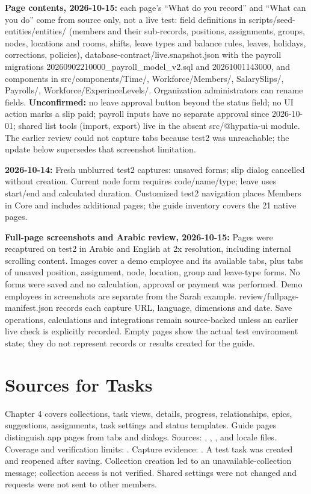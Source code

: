 \textbf{Page contents, 2026-10-15:} each page's “What do you record” and “What can you do” come from source only, not a live test: field definitions in scripts/seed-entities/entities/ (members and their sub-records, positions, assignments, groups, nodes, locations and rooms, shifts, leave types and balance rules, leaves, holidays, corrections, policies), database-contract/live.snapshot.json with the payroll migrations 20260902210000_payroll_model_v2.sql and 20261001143000, and components in src/components/Time/, Workforce/Members/, SalarySlips/, Payrolls/, Workforce/ExperinceLevels/. Organization administrators can rename fields. \textbf{Unconfirmed:} no leave approval button beyond the status field; no UI action marks a slip paid; payroll inputs have no separate approval since 2026-10-01; shared list tools (import, export) live in the absent src/@hypatia-ui module. The earlier review could not capture tabs because test2 was unreachable; the update below supersedes that screenshot limitation.

\textbf{2026-10-14:} Fresh unblurred test2 captures: unsaved forms; slip dialog cancelled without creation. Current node form requires code/name/type; leave uses start/end and calculated duration. Customized test2 navigation places Members in Core and includes additional pages; the guide inventory covers the 21 native pages.


\textbf{Full-page screenshots and Arabic review, 2026-10-15:} Pages were recaptured on test2 in Arabic and English at 2x resolution, including internal scrolling content. Images cover a demo employee and its available tabs, plus tabs of unsaved position, assignment, node, location, group and leave-type forms. No forms were saved and no calculation, approval or payment was performed. Demo employees in screenshots are separate from the Sarah example. review/fullpage-manifest.json records each capture URL, language, dimensions and date. Save operations, calculations and integrations remain source-backed unless an earlier live check is explicitly recorded. Empty pages show the actual test environment state; they do not represent records or results created for the guide.


\section{Sources for Tasks}
\label{sec:sources-tasks}
Chapter 4 covers collections, task views, details, progress, relationships, epics, suggestions, assignments, task settings and status templates. Guide pages distinguish app pages from tabs and dialogs.
Sources: , , ,  and locale files. Coverage and verification limits: . Capture evidence: .
A test task was created and reopened after saving. Collection creation led to an unavailable-collection message; collection access is not verified. Shared settings were not changed and requests were not sent to other members.

